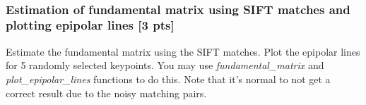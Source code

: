 \documentclass[11pt]{article}
\begin{document}
    \begin{center}
    \end{center}
    { \hspace*{\fill} \\}
    
    \subsubsection{Estimation of fundamental matrix using SIFT matches and
plotting epipolar lines {[}3
pts{]}}\label{estimation-of-fundamental-matrix-using-sift-matches-and-plotting-epipolar-lines-3-pts}

Estimate the fundamental matrix using the SIFT matches. Plot the
epipolar lines for 5 randomly selected keypoints. You may use
\emph{fundamental\_matrix} and \emph{plot\_epipolar\_lines} functions to
do this. Note that it's normal to not get a correct result due to the
noisy matching pairs.
\end{document}
